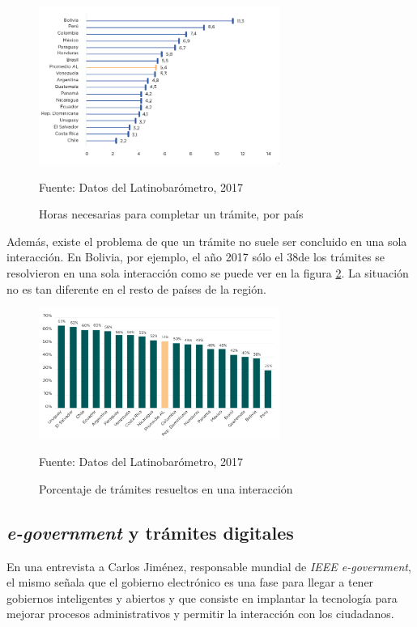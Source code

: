 \begin{figure}[htbp]
    \centering
    \includegraphics[width=0.7\textwidth]{assets/horastramite}
    \caption{Horas necesarias para completar un trámite, por país}{Fuente: Datos del Latinobarómetro, 2017}
    \label{fig:horastramite}
\end{figure}

Además, existe el problema de que un trámite no suele ser concluido en una sola interacción. En Bolivia, por ejemplo, el año 2017 sólo el 38\percentsign  de los trámites se resolvieron en una sola interacción como se puede ver en la figura \ref{fig:tramites_una_interaccion}. La situación no es tan diferente en el resto de países de la región.

\begin{figure}
    \centering
    \includegraphics[width=0.7\textwidth]{assets/tramites_una_interaccion}
    \caption{Porcentaje de trámites resueltos en una interacción}{Fuente: Datos del Latinobarómetro, 2017}
    \label{fig:tramites_una_interaccion}
\end{figure}

\subsection{\textit{e-government} y trámites digitales}

En una entrevista a Carlos Jiménez, responsable mundial de \textit{IEEE
e-government}, el mismo señala que el gobierno electrónico es una fase para
llegar a tener gobiernos inteligentes y abiertos y que consiste en implantar la
tecnología para mejorar procesos administrativos y permitir la interacción con
los ciudadanos.

